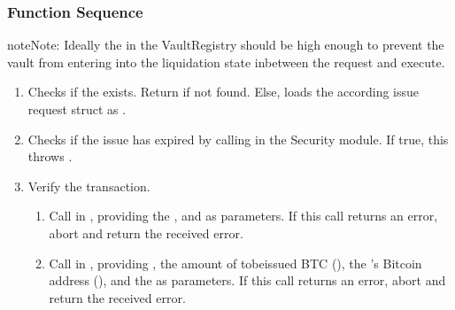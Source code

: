 \documentclass[a4paper,10pt,english]{sphinxmanual}
\begin{document}
\subsubsection{Function Sequence}
\label{\detokenize{spec/issue:id7}}
\begin{sphinxadmonition}{note}{Note:}
Ideally the  in the VaultRegistry should be high enough to prevent the vault from entering into the liquidation state in\sphinxhyphen{}between the request and execute.
\end{sphinxadmonition}
\begin{enumerate}
%
\item {} 
Checks if the  exists. Return  if not found. Else, loads the according issue request struct as .

\item {} 
Checks if the issue has expired by calling {\hyperref[\detokenize{spec/security:hasexpired}]{}} in the Security module. If true, this throws .

\item {} 
Verify the transaction.
\begin{enumerate}
%
\item {} 
Call  in {\hyperref[\detokenize{spec/btc-relay:btc-relay}]{}}, providing the , and  as parameters. If this call returns an error, abort and return the received error.

\item {} 
Call  in {\hyperref[\detokenize{spec/btc-relay:btc-relay}]{}}, providing , the amount of to\sphinxhyphen{}be\sphinxhyphen{}issued BTC (), the ’s Bitcoin address (), and the  as parameters. If this call returns an error, abort and return the received error.


\end{enumerate}
\end{enumerate}
\end{document}
